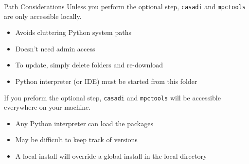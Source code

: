 \documentclass[xcolor=dvipsnames]{beamer}
\begin{document}
\begin{frame}{Path Considerations}
    Unless you perform the optional step, \texttt{casadi} and \texttt{mpctools} are only accessible locally.
    \begin{itemize}
        \item Avoids cluttering Python system paths
        \item Doesn't need admin access
        \item To update, simply delete folders and re-download
        \item Python interpreter (or IDE) must be started from this folder
    \end{itemize}
    
    \medskip
    
    If you preform the optional step, \texttt{casadi} and \texttt{mpctools} will be accessible everywhere on your machine.
    \begin{itemize}
        \item Any Python interpreter can load the packages
        \item May be difficult to keep track of versions
        \item A local install will override a global install in the local directory
    \end{itemize}
\end{frame}
\end{document}
